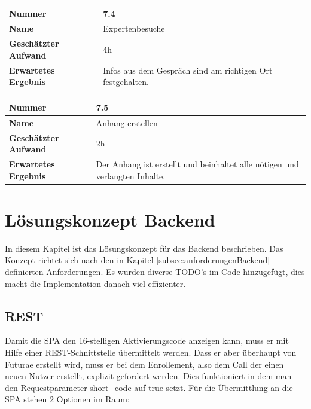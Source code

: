 \begin{longtable}{p{}|p{}}
	\hline
	\textbf{Nummer}    				& 7.4 \\
	\hline
	\textbf{Name}   				& Expertenbesuche\\
	\hline
	\textbf{Geschätzter Aufwand}	& 4h \\
	\hline
	\textbf{Erwartetes Ergebnis}	& Infos aus dem Gespräch sind am richtigen Ort festgehalten.\\
	\hline
\end{longtable}

\begin{longtable}{p{}|p{}}
	\hline
	\textbf{Nummer}    				& 7.5 \\
	\hline
	\textbf{Name}   				& Anhang erstellen\\
	\hline
	\textbf{Geschätzter Aufwand}	& 2h \\
	\hline
	\textbf{Erwartetes Ergebnis}	& Der Anhang ist erstellt und beinhaltet alle nötigen und verlangten Inhalte.\\
	\hline
\end{longtable} 
\newpage

\section{Lösungskonzept Backend}

In diesem Kapitel ist das Lösungskonzept für das Backend beschrieben. Das Konzept richtet sich nach den in Kapitel \ref{subsec:anforderungenBackend} definierten Anforderungen. Es wurden diverse TODO's im Code hinzugefügt, dies macht die Implementation danach viel effizienter.

\subsection{REST}\label{subsec:rest}

Damit die SPA den 16-stelligen Aktivierungscode anzeigen kann, muss er mit Hilfe einer REST-Schnittstelle übermittelt werden. Dass er aber überhaupt von Futurae erstellt wird, muss er bei dem Enrollement, also dem Call der einen neuen Nutzer erstellt, explizit gefordert werden. 
Dies funktioniert in dem man den Requestparameter \flqq short\_code\frqq{} auf true setzt. Für die Übermittlung an die SPA stehen 2 Optionen im Raum:

